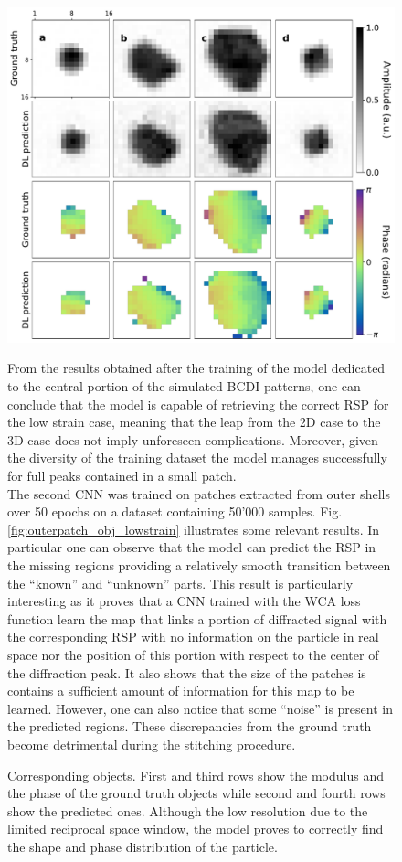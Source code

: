 \begin{figure}[H]
    \centering
    \includegraphics[width=\textwidth]{figures/Phasing/central_patch_lowstrain_obj.pdf}
    \caption{Corresponding objects. First and third rows show the modulus and the phase of the ground truth objects while
    second and fourth rows show the predicted ones. Although the low resolution due to the limited reciprocal space window, 
    the model proves to correctly find the shape and phase distribution of the particle. }

    \label{fig:centralpatch_obj_lowstrain}


From the results obtained after the training of the model dedicated to the central portion of the simulated BCDI patterns, 
one can conclude that the model is capable of retrieving the correct RSP for the low strain case, meaning that the leap from 
the 2D case to the 3D case does not imply unforeseen complications. Moreover, given the diversity of the training dataset 
the model manages successfully for full peaks contained in a small patch. \\

The second CNN was trained on patches extracted from outer shells over 50 epochs on a dataset containing 50'000 samples. 
Fig. \ref{fig:outerpatch_obj_lowstrain} illustrates some relevant results. In particular one can observe that the model 
can predict the RSP in the missing regions providing a relatively smooth transition between the ``known'' and ``unknown''
parts. This result is particularly interesting as it proves that a CNN trained with the WCA loss function 
learn the map that links a portion of diffracted signal with the corresponding RSP with no information on the particle in
real space nor the position of this portion with respect to the center of the diffraction peak. It also shows that the 
size of the patches is contains a sufficient amount of information for this map to be learned. 
However, one can also notice that some ``noise'' is present in the predicted regions. These discrepancies from the ground 
truth become detrimental during the stitching procedure. 

\end{figure}
